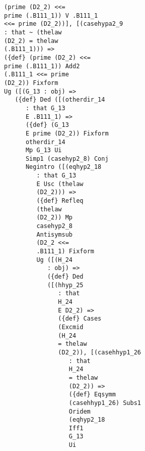 \documentclass[12pt]{article}
\begin{document}
\begin{verbatim}
                         (prime (D2_2) <<= 
                         prime (.B111_1)) V .B111_1 
                         <<= prime (D2_2))], [(casehypa2_9 
                         : that ~ (thelaw 
                         (D2_2) = thelaw 
                         (.B111_1))) => 
                         ({def} (prime (D2_2) <<= 
                         prime (.B111_1)) Add2 
                         (.B111_1 <<= prime 
                         (D2_2)) Fixform 
                         Ug ([(G_13 : obj) => 
                            ({def} Ded ([(otherdir_14 
                               : that G_13 
                               E .B111_1) => 
                               ({def} (G_13 
                               E prime (D2_2)) Fixform 
                               otherdir_14 
                               Mp G_13 Ui 
                               Simp1 (casehyp2_8) Conj 
                               Negintro ([(eqhyp2_18 
                                  : that G_13 
                                  E Usc (thelaw 
                                  (D2_2))) => 
                                  ({def} Refleq 
                                  (thelaw 
                                  (D2_2)) Mp 
                                  casehyp2_8 
                                  Antisymsub 
                                  (D2_2 <<= 
                                  .B111_1) Fixform 
                                  Ug ([(H_24 
                                     : obj) => 
                                     ({def} Ded 
                                     ([(hhyp_25 
                                        : that 
                                        H_24 
                                        E D2_2) => 
                                        ({def} Cases 
                                        (Excmid 
                                        (H_24 
                                        = thelaw 
                                        (D2_2)), [(casehhyp1_26 
                                           : that 
                                           H_24 
                                           = thelaw 
                                           (D2_2)) => 
                                           ({def} Eqsymm 
                                           (casehhyp1_26) Subs1 
                                           Oridem 
                                           (eqhyp2_18 
                                           Iff1 
                                           G_13 
                                           Ui 

\end{verbatim}
\end{document}
